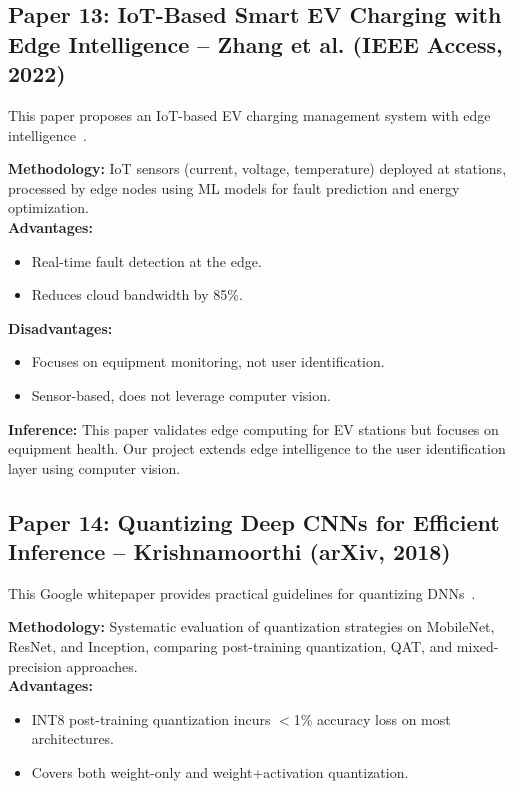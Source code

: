 \documentclass[11pt]{report}
\begin{document}
\subsection{Paper 13: IoT-Based Smart EV Charging with Edge Intelligence -- Zhang et al. (IEEE Access, 2022)}
This paper proposes an IoT-based EV charging management system with edge intelligence~\cite{zhang2022}. \par

\textbf{Methodology:} IoT sensors (current, voltage, temperature) deployed at stations, processed by edge nodes using ML models for fault prediction and energy optimization. \\

\textbf{Advantages:}
\begin{itemize}
    \item Real-time fault detection at the edge.
    \item Reduces cloud bandwidth by 85\%.
\end{itemize}

\textbf{Disadvantages:}
\begin{itemize}
    \item Focuses on equipment monitoring, not user identification.
    \item Sensor-based, does not leverage computer vision.
\end{itemize}

\textbf{Inference:}
This paper validates edge computing for EV stations but focuses on equipment health. Our project extends edge intelligence to the user identification layer using computer vision.

\subsection{Paper 14: Quantizing Deep CNNs for Efficient Inference -- Krishnamoorthi (arXiv, 2018)}
This Google whitepaper provides practical guidelines for quantizing DNNs~\cite{krishnamoorthi2018}. \par

\textbf{Methodology:} Systematic evaluation of quantization strategies on MobileNet, ResNet, and Inception, comparing post-training quantization, QAT, and mixed-precision approaches. \\

\textbf{Advantages:}
\begin{itemize}
    \item INT8 post-training quantization incurs $<$1\% accuracy loss on most architectures.
    \item Covers both weight-only and weight+activation quantization.
\end{itemize}
\end{document}
